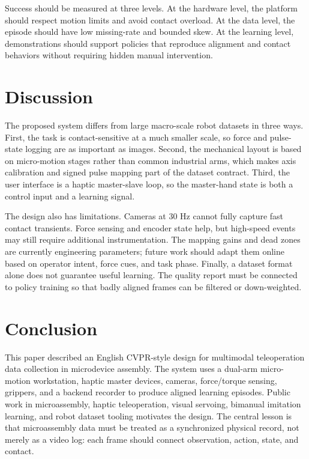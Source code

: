 \documentclass[10pt,twocolumn,letterpaper]{article}
\begin{document}
Success should be measured at three levels. At the hardware level, the
platform should respect motion limits and avoid contact overload. At the
data level, the episode should have low missing-rate and bounded skew. At
the learning level, demonstrations should support policies that reproduce
alignment and contact behaviors without requiring hidden manual
intervention.

\section{Discussion}
The proposed system differs from large macro-scale robot datasets in
three ways. First, the task is contact-sensitive at a much smaller scale,
so force and pulse-state logging are as important as images. Second, the
mechanical layout is based on micro-motion stages rather than common
industrial arms, which makes axis calibration and signed pulse mapping
part of the dataset contract. Third, the user interface is a haptic
master-slave loop, so the master-hand state is both a control input and a
learning signal.

The design also has limitations. Cameras at 30 Hz cannot fully capture
fast contact transients. Force sensing and encoder state help, but
high-speed events may still require additional instrumentation. The
mapping gains and dead zones are currently engineering parameters; future
work should adapt them online based on operator intent, force cues, and
task phase. Finally, a dataset format alone does not guarantee useful
learning. The quality report must be connected to policy training so that
badly aligned frames can be filtered or down-weighted.

\section{Conclusion}
This paper described an English CVPR-style design for multimodal
teleoperation data collection in microdevice assembly. The system uses a
dual-arm micro-motion workstation, haptic master devices, cameras,
force/torque sensing, grippers, and a backend recorder to produce aligned
learning episodes. Public work in microassembly, haptic teleoperation,
visual servoing, bimanual imitation learning, and robot dataset tooling
motivates the design. The central lesson is that microassembly data must
be treated as a synchronized physical record, not merely as a video log:
each frame should connect observation, action, state, and contact.
\end{document}
